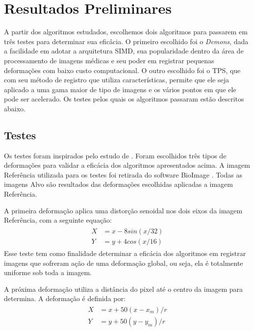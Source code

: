 \chapter{Resultados Preliminares}
\label{cap:resultados}
	A partir dos algoritmos estudados, escolhemos dois algoritmos para passarem em três testes para determinar sua 
eficâcia. O primeiro escolhido foi o \textit{Demons}, dada a facilidade em adotar a arquitetura SIMD, sua popularidade 
dentro da área de processamento de imagens médicas e seu poder em registrar pequenas deformações com baixo custo 
computacional. O outro escolhido foi o TPS, que com seu método de registro que utiliza características, permite que ele
seja aplicado a uma gama maior de tipo de imagens e os vários pontos em que ele pode ser acelerado. Os testes pelos 
quais os algoritmos passaram estão descritos abaixo.

\section{Testes}
	Os testes foram inspirados pelo estudo de \cite{zagorchev2006comparative}. Foram escolhidos três tipos
de deformações para validar a eficácia dos algoritmos apresentados acima. A imagem Referência utilizada para os
testes foi retirada do software BioImage \cite{papademetris2005bioimage}. Todas as imagens Alvo são resultados
das deformações escolhidas aplicadas a imagem Referência.

	A primeira deformação aplica uma distorção senoidal nos dois eixos da imagem Referência, com a
seguinte equação:
\begin{align} \label{math:sin}
\begin{split}
	X &= x - 8sin(x/32) \\
	Y &= y + 4cos(x/16)
\end{split}  	
\end{align}
	Esse teste tem como finalidade determinar a eficácia dos algoritmos em registrar imagens que sofreram
ação de uma deformação global, ou seja, ela é totalmente uniforme sob toda a imagem.

	A próxima deformação utiliza a distância do pixel até o centro da imagem para determina. A deformação
é definida por:
\begin{align} \label{math:dist}
\begin{split}
	X &= x + 50(x-x_m)/r \\
	Y &= y + 50(y-y_m)/r 
\end{split} 
\end{align}

